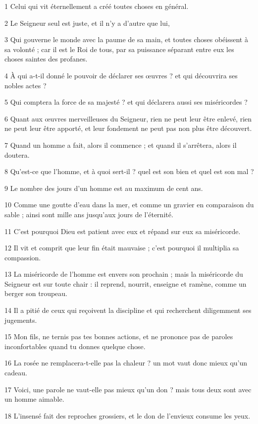 \par 1 Celui qui vit éternellement a créé toutes choses en général.
\par 2 Le Seigneur seul est juste, et il n'y a d'autre que lui,
\par 3 Qui gouverne le monde avec la paume de sa main, et toutes choses obéissent à sa volonté ; car il est le Roi de tous, par sa puissance séparant entre eux les choses saintes des profanes.
\par 4 À qui a-t-il donné le pouvoir de déclarer ses œuvres ? et qui découvrira ses nobles actes ?
\par 5 Qui comptera la force de sa majesté ? et qui déclarera aussi ses miséricordes ?
\par 6 Quant aux œuvres merveilleuses du Seigneur, rien ne peut leur être enlevé, rien ne peut leur être apporté, et leur fondement ne peut pas non plus être découvert.
\par 7 Quand un homme a fait, alors il commence ; et quand il s'arrêtera, alors il doutera.
\par 8 Qu'est-ce que l'homme, et à quoi sert-il ? quel est son bien et quel est son mal ?
\par 9 Le nombre des jours d'un homme est au maximum de cent ans.
\par 10 Comme une goutte d'eau dans la mer, et comme un gravier en comparaison du sable ; ainsi sont mille ans jusqu'aux jours de l'éternité.
\par 11 C'est pourquoi Dieu est patient avec eux et répand sur eux sa miséricorde.
\par 12 Il vit et comprit que leur fin était mauvaise ; c'est pourquoi il multiplia sa compassion.
\par 13 La miséricorde de l'homme est envers son prochain ; mais la miséricorde du Seigneur est sur toute chair : il reprend, nourrit, enseigne et ramène, comme un berger son troupeau.
\par 14 Il a pitié de ceux qui reçoivent la discipline et qui recherchent diligemment ses jugements.
\par 15 Mon fils, ne ternis pas tes bonnes actions, et ne prononce pas de paroles inconfortables quand tu donnes quelque chose.
\par 16 La rosée ne remplacera-t-elle pas la chaleur ? un mot vaut donc mieux qu'un cadeau.
\par 17 Voici, une parole ne vaut-elle pas mieux qu'un don ? mais tous deux sont avec un homme aimable.
\par 18 L'insensé fait des reproches grossiers, et le don de l'envieux consume les yeux.
